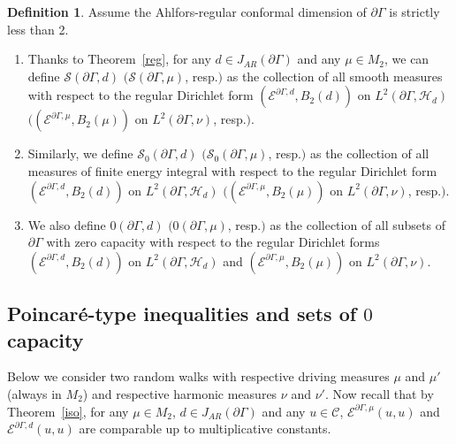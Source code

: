 \documentclass[10pt]{amsart}
\theoremstyle{definition}\newtheorem{defi}[theo]{Definition}\newtheorem{rema}[theo]{Remark}\newtheorem{exam}[theo]{Example}\newtheorem{exem}[theo]{Example}\newtheorem{nota}[theo]{Notation}
\newcommand{\ce}{\mathcal{E}}
\newcommand{\cs}{\mathcal{S}}
\newcommand{\ch}{\mathcal{H}}
\newcommand{\cC}{\mathcal{C}}
\begin{document}
\begin{defi}\label{SS}
Assume the Ahlfors-regular conformal dimension of $\partial\Gamma$ is strictly less than 2.
\begin{enumerate}
\item\label{defi6.9.1} Thanks to Theorem~\ref{reg}, for any $d\in J_{AR}(\partial\Gamma)$ and any $\mu\in M_2$, we can define $\cs(\partial \Gamma,d)$ $(\cs(\partial \Gamma,\mu)$, resp.$)$ as the collection of all smooth measures with respect to the regular Dirichlet form $(\ce^{\partial\Gamma,d},B_2(d))$ on $L^2(\partial\Gamma,\ch_{d})$ $((\ce^{\partial\Gamma,\mu},B_2(\mu))$ on $L^2(\partial\Gamma,\nu)$, resp.$)$.
\item\label{defi6.9.2} Similarly, we define $\cs_0(\partial \Gamma,d)$ $(\cs_0(\partial \Gamma,\mu)$, resp.$)$ as the collection of all measures of finite energy integral with respect to the regular Dirichlet form $(\ce^{\partial\Gamma,d},B_2(d))$ on $L^2(\partial\Gamma,\ch_{d})$ $((\ce^{\partial\Gamma,\mu},B_2(\mu))$ on $L^2(\partial\Gamma,\nu)$, resp.$)$.
\item\label{defi6.9.3} We also define $0(\partial \Gamma,d)$ $(0(\partial \Gamma,\mu)$, resp.$)$ as the collection of all subsets of $\partial\Gamma$ with zero capacity with respect to the regular Dirichlet forms $(\ce^{\partial\Gamma,d},B_2(d))$ on $L^2(\partial\Gamma,\ch_{d})$ and \newline
$(\ce^{\partial\Gamma,\mu},B_2(\mu))$ on $L^2(\partial\Gamma,\nu)$.
\end{enumerate}
\end{defi}

\subsection{Poincaré-type inequalities and sets of \texorpdfstring{$0$}{0} capacity}

Below we consider two random walks with respective driving measures $\mu$ and $\mu'$ (always in $M_2$) and respective harmonic measures $\nu$ and $\nu'$. Now recall that by Theorem~\ref{iso}, for any $\mu\in M_2$, $d\in J_{AR}(\partial\Gamma)$ and any $u\in\cC$, $\ce^{\partial\Gamma,\mu}(u,u)$ and $\ce^{\partial\Gamma,d}(u,u)$ are comparable up to multiplicative constants.
\end{document}
